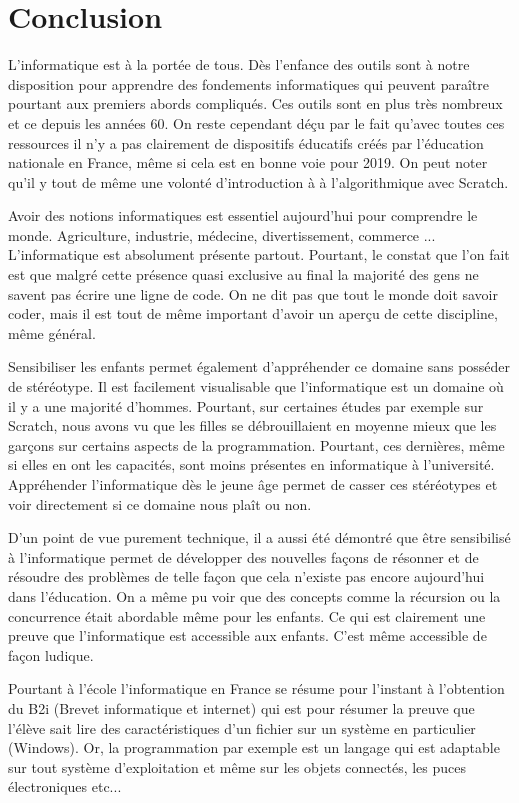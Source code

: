 \chapter{Conclusion}

L'informatique est à la portée de tous. Dès l'enfance des outils sont à notre disposition pour apprendre des fondements informatiques qui peuvent paraître pourtant aux premiers abords compliqués. Ces outils sont en plus très nombreux et ce depuis les années 60. On reste cependant déçu par le fait qu'avec toutes ces ressources il n'y a pas clairement de dispositifs éducatifs créés par l'éducation nationale en France, même si cela est en bonne voie pour 2019. On peut noter qu'il y tout de même une volonté d'introduction à à l'algorithmique avec Scratch. \cite{25}

Avoir des notions informatiques est essentiel aujourd'hui pour comprendre le monde. Agriculture, industrie, médecine, divertissement, commerce ... L'informatique est absolument présente partout. Pourtant, le constat que l'on fait est que malgré cette présence quasi exclusive au final la majorité des gens ne savent pas écrire une ligne de code. On ne dit pas que tout le monde doit savoir coder, mais il est tout de même important d'avoir un aperçu de cette discipline, même général.

Sensibiliser les enfants permet également d'appréhender ce domaine sans posséder de stéréotype. Il est facilement visualisable que l'informatique est un domaine où il y a une majorité d'hommes. Pourtant, sur certaines études par exemple sur Scratch, nous avons vu que les filles se débrouillaient en moyenne mieux que les garçons sur certains aspects de la programmation. Pourtant, ces dernières, même si elles en ont les capacités, sont moins présentes en informatique à l'université. Appréhender l'informatique dès le jeune âge permet de casser ces stéréotypes et voir directement si ce domaine nous plaît ou non.

D'un point de vue purement technique, il a aussi été démontré que être sensibilisé à l'informatique permet de développer des nouvelles façons de résonner et de résoudre des problèmes de telle façon que cela n'existe pas encore aujourd'hui dans l'éducation. On a même pu voir que des concepts comme la récursion ou la concurrence était abordable même pour les enfants. Ce qui est clairement une preuve que l'informatique est accessible aux enfants. C'est même accessible de façon ludique.

Pourtant à l'école l'informatique en France se résume pour l'instant à l'obtention du B2i (Brevet informatique et internet) qui est pour résumer la preuve que l'élève sait lire des caractéristiques d'un fichier sur un système en particulier (Windows). Or, la programmation par exemple est un langage qui est adaptable sur tout système d'exploitation et même sur les objets connectés, les puces électroniques etc...

